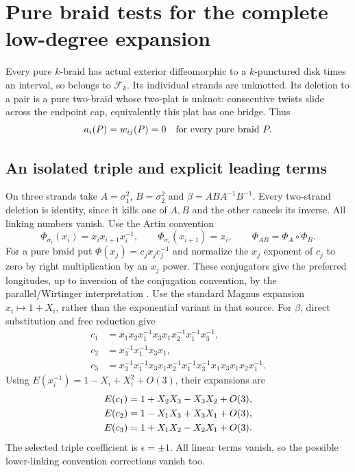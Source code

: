 \documentclass[11pt]{article}
\theoremstyle{remark}\newtheorem{remark}[theorem]{Remark}
\newcommand{\F}{\mathcal F}
\begin{document}
\section{Pure braid tests for the complete low-degree expansion}
Every pure $k$-braid has actual exterior diffeomorphic to a $k$-punctured
disk times an interval, so belongs to $\F_k$. Its individual strands are
unknotted. Its deletion to a pair is a pure two-braid whose two-plat is
unknot: consecutive twists slide across the endpoint cap, equivalently
this plat has one bridge. Thus
\begin{equation}\label{eq:braid-vanish}
a_i(P)=w_{ij}(P)=0\quad\hbox{for every pure braid }P.
\end{equation}

\subsection{An isolated triple and explicit leading terms}
On three strands take $A=\sigma_1^2$, $B=\sigma_2^2$ and
$\beta=ABA^{-1}B^{-1}$. Every two-strand deletion is identity, since it kills
one of $A,B$ and the other cancels its inverse. All linking numbers vanish.
Use the Artin convention
\[
\Phi_{\sigma_i}(x_i)=x_ix_{i+1}x_i^{-1},\qquad
\Phi_{\sigma_i}(x_{i+1})=x_i,\qquad
\Phi_{AB}=\Phi_A\circ\Phi_B.
\]
For a pure braid put $\Phi(x_j)=c_jx_jc_j^{-1}$ and normalize the $x_j$
exponent of $c_j$ to zero by right multiplication by an $x_j$ power.
These conjugators give the preferred longitudes, up to inversion of the
conjugation convention, by the parallel/Wirtinger interpretation
\cite[\S4.1 and \S5.2]{BNhomotopy}. Use the standard Magnus expansion
$x_i\mapsto1+X_i$, rather than the exponential variant in that source.
For $\beta$, direct substitution and free reduction give
\begin{align*}
c_1&=x_1x_2x_1^{-1}x_3x_1x_2^{-1}x_1^{-1}x_3^{-1},\\
c_2&=x_3^{-1}x_1^{-1}x_3x_1,\\
c_3&=x_3^{-1}x_1^{-1}x_3x_1x_2^{-1}x_1^{-1}
      x_3^{-1}x_1x_3x_1x_2x_1^{-1}.
\end{align*}
Using $E(x_i^{-1})=1-X_i+X_i^2+O(3)$, their expansions are
\begin{align}
E(c_1)&=1+X_2X_3-X_3X_2+O(3),\notag\\
E(c_2)&=1-X_1X_3+X_3X_1+O(3),\label{eq:magnus}\\
E(c_3)&=1+X_1X_2-X_2X_1+O(3).\notag
\end{align}
The selected triple coefficient is $\epsilon=\pm1$. All linear terms vanish,
so the possible lower-linking convention corrections vanish too.
\end{document}
